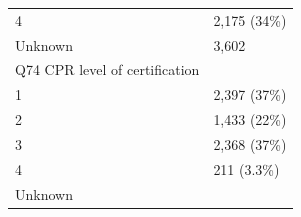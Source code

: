 \documentclass[]{article}
\begin{document}
\begin{longtable}[]{@{}ll@{}}
\begin{minipage}[t]{0.71\columnwidth}\raggedright
4\strut
\end{minipage} & \begin{minipage}[t]{0.23\columnwidth}\raggedright
2,175 (34\%)\strut
\end{minipage}\tabularnewline
\begin{minipage}[t]{0.71\columnwidth}\raggedright
Unknown\strut
\end{minipage} & \begin{minipage}[t]{0.23\columnwidth}\raggedright
3,602\strut
\end{minipage}\tabularnewline
\begin{minipage}[t]{0.71\columnwidth}\raggedright
Q74 CPR level of certification\strut
\end{minipage} & \begin{minipage}[t]{0.23\columnwidth}\raggedright
\strut
\end{minipage}\tabularnewline
\begin{minipage}[t]{0.71\columnwidth}\raggedright
1\strut
\end{minipage} & \begin{minipage}[t]{0.23\columnwidth}\raggedright
2,397 (37\%)\strut
\end{minipage}\tabularnewline
\begin{minipage}[t]{0.71\columnwidth}\raggedright
2\strut
\end{minipage} & \begin{minipage}[t]{0.23\columnwidth}\raggedright
1,433 (22\%)\strut
\end{minipage}\tabularnewline
\begin{minipage}[t]{0.71\columnwidth}\raggedright
3\strut
\end{minipage} & \begin{minipage}[t]{0.23\columnwidth}\raggedright
2,368 (37\%)\strut
\end{minipage}\tabularnewline
\begin{minipage}[t]{0.71\columnwidth}\raggedright
4\strut
\end{minipage} & \begin{minipage}[t]{0.23\columnwidth}\raggedright
211 (3.3\%)\strut
\end{minipage}\tabularnewline
\begin{minipage}[t]{0.71\columnwidth}\raggedright
Unknown\strut
\end{minipage} & \begin{minipage}[t]{0.23\columnwidth}\raggedright

\end{minipage}
\end{longtable}
\end{document}
